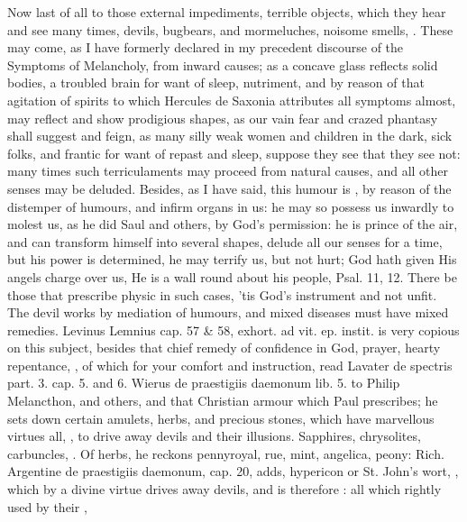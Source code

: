 {Now last of all to those external impediments, terrible objects, which
they hear and see many times, devils, bugbears, and mormeluches,
noisome smells, \etc{}. These may come, as I have formerly declared in my
precedent discourse of the Symptoms of Melancholy, from inward causes;
as a concave glass reflects solid bodies, a troubled brain for want of
sleep, nutriment, and by reason of that agitation of spirits to which
Hercules de Saxonia attributes all symptoms almost, may reflect and
show prodigious shapes, as our vain fear and crazed phantasy shall
suggest and feign, as many silly weak women and children in the dark,
sick folks, and frantic for want of repast and sleep, suppose they see
that they see not: many times such terriculaments may proceed from
natural causes, and all other senses may be deluded. Besides, as I have
said, this humour is , by reason of
the distemper of humours, and infirm organs in us: he may so possess us
inwardly to molest us, as he did Saul and others, by God's permission:
he is prince of the air, and can transform himself into several shapes,
delude all our senses for a time, but his power is determined, he may
terrify us, but not hurt; God hath given His angels charge over us, He
is a wall round about his people, Psal.  11, 12. There be those
that prescribe physic in such cases, 'tis God's instrument and not
unfit. The devil works by mediation of humours, and mixed diseases must
have mixed remedies. Levinus Lemnius \textlatin{cap. 57 \& 58, exhort. ad vit. ep.
instit.} is very copious on this subject, besides that chief remedy of
confidence in God, prayer, hearty repentance, \etc{}, of which for your
comfort and instruction, read Lavater \textlatin{de spectris part. 3. cap. 5.} and
\textlatin{6}. Wierus \textlatin{de praestigiis daemonum lib. 5.} to Philip Melancthon, and
others, and that Christian armour which Paul prescribes; he sets down
certain amulets, herbs, and precious stones, which have marvellous
virtues all, , to drive away devils and their
illusions. Sapphires, chrysolites, carbuncles, \etc{}.  Of herbs, he reckons  pennyroyal,
rue, mint, angelica, peony: Rich. Argentine \textlatin{de praestigiis daemonum,
cap. 20}, adds, hypericon or St. John's wort, , which by
a divine virtue drives away devils, and is therefore : all
which rightly used by their , }
